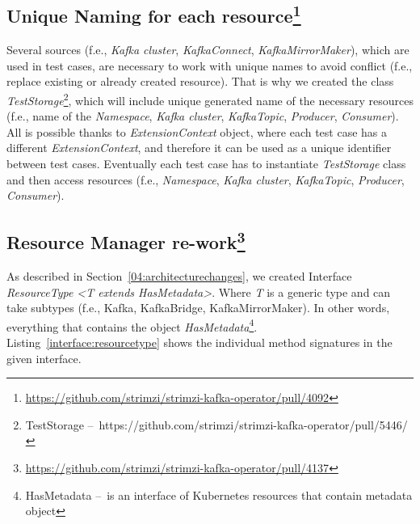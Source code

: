 \subsection{Unique Naming for each resource\protect\footnote{\url{https://github.com/strimzi/strimzi-kafka-operator/pull/4092}}}
\label{05:sub:sec:unique}

Several sources (f.e., \emph{Kafka cluster}, \emph{KafkaConnect}, \emph{KafkaMirrorMaker}), which are used in test cases,
are necessary to work with unique names to avoid conflict (f.e., replace existing or already created resource).
That is why we created the class \emph{TestStorage}\footnote{TestStorage \---\ https://github.com/strimzi/strimzi-kafka-operator/pull/5446/},
which will include unique generated name of the necessary resources (f.e., name of the \emph{Namespace}, \emph{Kafka cluster},
\emph{KafkaTopic}, \emph{Producer}, \emph{Consumer}).
All is possible thanks to \emph{ExtensionContext} object, where each test case has a different \emph{ExtensionContext},
and therefore it can be used as a unique identifier between test cases.
Eventually each test case has to instantiate \emph{TestStorage} class and then access resources (f.e., \emph{Namespace}, \emph{Kafka cluster},
\emph{KafkaTopic}, \emph{Producer}, \emph{Consumer}).

\subsection{Resource Manager re-work\protect\footnote{\url{https://github.com/strimzi/strimzi-kafka-operator/pull/4137}}}
\label{05:sub:sec:resourcemanager}

As described in Section~\ref{04:architecturechanges}, we created Interface \emph{ResourceType <T extends HasMetadata>}.
Where \emph{T} is a generic type and can take subtypes (f.e., Kafka, KafkaBridge, KafkaMirrorMaker).
In other words, everything that contains the object \emph{HasMetadata}\footnote{HasMetadata \---\ is an interface of
Kubernetes resources that contain metadata object}.
Listing~\ref{interface:resourcetype} shows the individual method signatures in the given interface.

